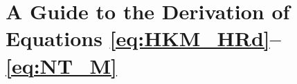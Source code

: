 \section{A Guide to the Derivation of Equations \eqref{eq:HKM_HRd}--\eqref{eq:NT_M}} \label{sec:guide_for_dir_eq}




